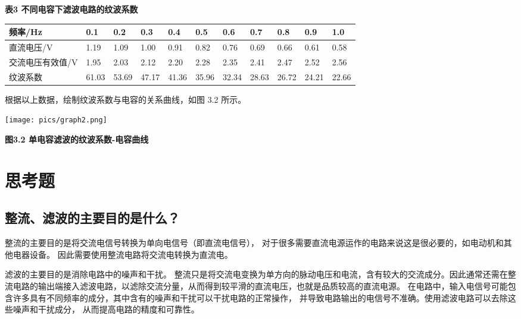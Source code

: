 \documentclass[10pt,a4paper]{article}	%
\makeatletter
\newenvironment{figurehere}
{\def\@captype{figure}}
{}
\newenvironment{tablehere}
{\def\@captype{table}}
{}
\makeatother
\begin{document}
		\begin{tablehere}
			\caption*{\bf 表3 不同电容下滤波电路的纹波系数}
			\centering
			\noindent
			\begin{tabular}{|l|l|l|l|l|l|l|l|l|l|l|}
				\hline
				频率/Hz     & 0.1   & 0.2   & 0.3   & 0.4   & 0.5   & 0.6   & 0.7   & 0.8   & 0.9   & 1.0   \\ \hline
				直流电压/V    & 1.19  & 1.09  & 1.00  & 0.91  & 0.82  & 0.76  & 0.69  & 0.66  & 0.61  & 0.58  \\ \hline
				交流电压有效值/V & 1.95  & 2.03  & 2.12  & 2.20  & 2.28  & 2.35  & 2.41  & 2.47  & 2.52  & 2.56  \\ \hline
				纹波系数      & 61.03 & 53.69 & 47.17 & 41.36 & 35.96 & 32.34 & 28.63 & 26.72 & 24.21 & 22.66 \\ \hline
			\end{tabular}
			\vspace*{1em}
		\end{tablehere}

		根据以上数据，绘制纹波系数与电容的关系曲线，如图 3.2 所示。

		\begin{figurehere}
			\vspace*{1em}
			\centering
			\texttt{[image: pics/graph2.png]}
			\caption*{\bf 图3.2 单电容滤波的纹波系数-电容曲线}
			\vspace*{0.3em}
		\end{figurehere}
		
	\section{思考题}
		\subsection{整流、滤波的主要目的是什么？}

		整流的主要目的是将交流电信号转换为单向电信号（即直流电信号），
		对于很多需要直流电源运作的电路来说这是很必要的，如电动机和其他电器设备。
		因此需要使用整流电路将交流电转换为直流电。

		滤波的主要目的是消除电路中的噪声和干扰。
		整流只是将交流电变换为单方向的脉动电压和电流，含有较大的交流成分。因此通常还需在整流电路的输出端接入滤波电路，以滤除交流分量，从而得到较平滑的直流电压，也就是品质较高的直流电源。
		在电路中，输入电信号可能包含许多具有不同频率的成分，其中含有的噪声和干扰可以干扰电路的正常操作，
		并导致电路输出的电信号不准确。使用滤波电路可以去除这些噪声和干扰成分，
		从而提高电路的精度和可靠性。
\end{document}
